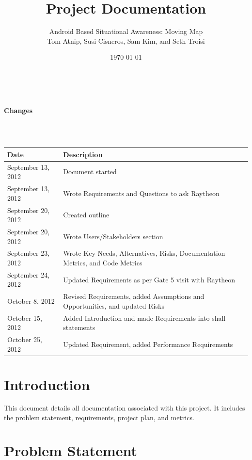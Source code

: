 \documentclass{article}
\begin{document}
\setlength{\voffset}{3.5in}
\title{Project Documentation}
\author{\Large Android Based Situational Awareness: Moving Map\\
Tom Atnip, Susi Cisneros, Sam Kim, and Seth Troisi}
\date{\today}
\maketitle
\clearpage
\setlength{\voffset}{0pt}
\tableofcontents
\clearpage
~\\
\begin{Large}\textbf{Changes}\end{Large}\\
~\\
\begin{tabular}{ | p{1.5in} | p{4.5in} | }
\hline
\textbf{Date} & \textbf{Description}\\
\hline
\hline
September 13, 2012 & Document started\\
\hline
September 13, 2012 & Wrote Requirements and Questions to ask Raytheon\\
\hline
September 20, 2012 & Created outline\\
\hline
September 20, 2012 & Wrote Users/Stakeholders section\\
\hline
September 23, 2012 & Wrote Key Needs, Alternatives, Risks, Documentation Metrics, and Code Metrics\\
\hline
September 24, 2012 & Updated Requirements as per Gate 5 visit with Raytheon\\
\hline
October 8, 2012 & Revised Requirements, added Assumptions and Opportunities, and updated Risks\\
\hline
October 15, 2012 & Added Introduction and made Requirements into shall statements\\
\hline
October 25, 2012 & Updated Requirement, added Performance Requirements\\
\hline
\end{tabular}
\clearpage

\section{Introduction}
This document details all documentation associated with this project.  It includes the problem statement, requirements, project plan, and metrics.

\section{Problem Statement}
\end{document}
